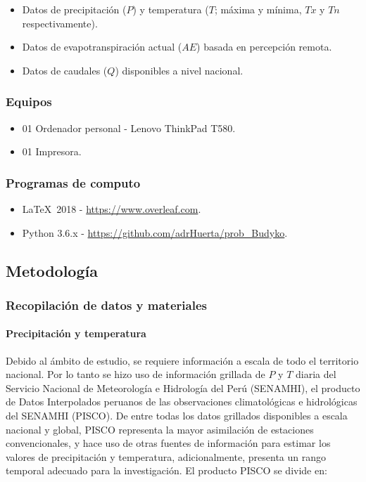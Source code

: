 \documentclass[12pt]{article}
\begin{document}
\begin{itemize}
  
  \item Datos de precipitación ($P$) y temperatura ($T$; máxima y mínima, $Tx$ y $Tn$ respectivamente).
  
  \item Datos de evapotranspiración actual ($AE$) basada en percepción remota.
  
  \item Datos de caudales ($Q$) disponibles a nivel nacional.

\end{itemize}

\subsubsection{Equipos}

\begin{itemize}
  \item 01 Ordenador personal - Lenovo ThinkPad T580.
  \item 01 Impresora.
\end{itemize}

\subsubsection{Programas de computo}

\begin{itemize}
  \item \LaTeX\  2018 - \url{https://www.overleaf.com}.
  \item Python 3.6.x - \url{https://github.com/adrHuerta/prob_Budyko}.
\end{itemize}

\subsection{Metodología}

\subsubsection{Recopilación de datos y materiales}

\paragraph{Precipitación y temperatura}\mbox{}

Debido al ámbito de estudio, se requiere información a escala de todo el territorio nacional. Por lo tanto se hizo uso de información grillada de $P$ y $T$ diaria del Servicio Nacional de Meteorología e Hidrología del Perú (SENAMHI), el producto de Datos Interpolados peruanos de las observaciones climatológicas e hidrológicas del SENAMHI (PISCO). De entre todas los datos grillados disponibles a escala nacional y global, PISCO representa la mayor asimilación de estaciones convencionales, y hace uso de otras fuentes de información para estimar los valores de precipitación y temperatura, adicionalmente, presenta un rango temporal adecuado para la investigación. El producto PISCO se divide en:
\end{document}
